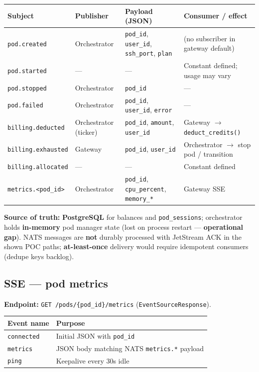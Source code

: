 \documentclass[12pt,a4paper]{article}
\begin{document}
\begin{tabularx}{\textwidth}{@{}L{3.2cm} L{2.5cm} X X@{}}
  \toprule
  \textbf{Subject} & \textbf{Publisher} & \textbf{Payload (JSON)} & \textbf{Consumer / effect} \\
  \midrule
  \texttt{pod.created} & Orchestrator & \texttt{pod\_id}, \texttt{user\_id}, \texttt{ssh\_port}, \texttt{plan} & (no subscriber in gateway default) \\
  \texttt{pod.started} & --- & --- & Constant defined; usage may vary \\
  \texttt{pod.stopped} & Orchestrator & \texttt{pod\_id} & --- \\
  \texttt{pod.failed} & Orchestrator & \texttt{pod\_id}, \texttt{user\_id}, \texttt{error} & --- \\
  \texttt{billing.deducted} & Orchestrator (ticker) & \texttt{pod\_id}, \texttt{amount}, \texttt{user\_id} & Gateway $\rightarrow$ \texttt{deduct\_credits()} \\
  \texttt{billing.exhausted} & Gateway & \texttt{pod\_id}, \texttt{user\_id} & Orchestrator $\rightarrow$ stop pod / transition \\
  \texttt{billing.allocated} & --- & --- & Constant defined \\
  \texttt{metrics.<pod\_id>} & Orchestrator & \texttt{pod\_id}, \texttt{cpu\_percent}, \texttt{memory\_*} & Gateway SSE \\
  \bottomrule
\end{tabularx}

\vspace{0.5em}
\noindent\textbf{Source of truth:} \textbf{PostgreSQL} for balances and \texttt{pod\_sessions}; orchestrator holds \textbf{in-memory} pod manager state (lost on process restart --- \textbf{operational gap}). NATS messages are \textbf{not} durably processed with JetStream ACK in the shown POC paths; \textbf{at-least-once} delivery would require idempotent consumers (dedupe keys backlog).

\subsection{SSE --- pod metrics}
\textbf{Endpoint:} \texttt{GET /pods/\{pod\_id\}/metrics} (\texttt{EventSourceResponse}).

\begin{tabularx}{\textwidth}{@{}L{3cm} X@{}}
  \toprule
  \textbf{Event name} & \textbf{Purpose} \\
  \midrule
  \texttt{connected} & Initial JSON with \texttt{pod\_id} \\
  \texttt{metrics} & JSON body matching NATS \texttt{metrics.*} payload \\
  \texttt{ping} & Keepalive every 30s idle \\
  \bottomrule
\end{tabularx}
\end{document}
